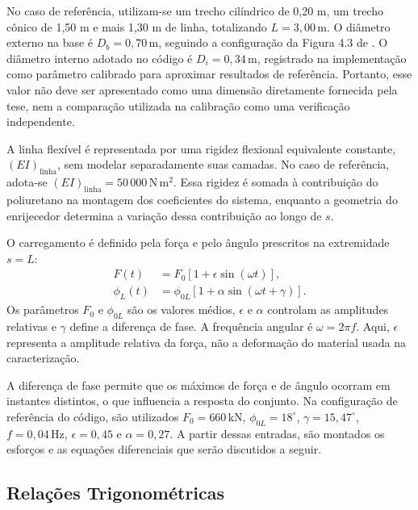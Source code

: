 \documentclass[arial,centeredequations,english,brazilian,oneside,section=TITLE]{ifes8}
\begin{document}
No caso de referência, utilizam-se um trecho cilíndrico de 0,20 m, um trecho cônico de
1,50 m e mais 1,30 m de linha, totalizando $L=3{,}00\,\mathrm{m}$. O diâmetro externo
na base é $D_b=0{,}70\,\mathrm{m}$, seguindo a configuração da Figura 4.3 de
. O diâmetro interno adotado no código é $D_i=0{,}34\,\mathrm{m}$,
registrado na implementação como parâmetro calibrado para aproximar resultados de
referência. Portanto, esse valor não deve ser apresentado como uma dimensão diretamente
fornecida pela tese, nem a comparação utilizada na calibração como uma verificação
independente.

A linha flexível é representada por uma rigidez flexional equivalente constante,
$(EI)_{\mathrm{linha}}$, sem modelar separadamente suas camadas. No caso de referência,
adota-se $(EI)_{\mathrm{linha}}=50\,000\,\mathrm{N\,m^2}$. Essa rigidez é somada à
contribuição do poliuretano na montagem dos coeficientes do sistema, enquanto a geometria
do enrijecedor determina a variação dessa contribuição ao longo de $s$.

O carregamento é definido pela força e pelo ângulo prescritos na extremidade $s=L$:
\begin{align}
  F(t)&=F_0\left[1+\epsilon\sin(\omega t)\right],
    \label{eq:forca-harmonica-metodologia}\\
  \phi_L(t)&=\phi_{0L}
    \left[1+\alpha\sin(\omega t+\gamma)\right].
    \label{eq:angulo-harmonico-metodologia}
\end{align}
Os parâmetros $F_0$ e $\phi_{0L}$ são os valores médios, $\epsilon$ e $\alpha$ controlam
as amplitudes relativas e $\gamma$ define a diferença de fase. A frequência angular é
$\omega=2\pi f$. Aqui, $\epsilon$ representa a amplitude relativa da força, não a
deformação do material usada na caracterização.

A diferença de fase permite que os máximos de força e de ângulo ocorram em instantes
distintos, o que influencia a resposta do conjunto. Na configuração de referência do
código, são utilizados $F_0=660\,\mathrm{kN}$, $\phi_{0L}=18^\circ$,
$\gamma=15{,}47^\circ$, $f=0{,}04\,\mathrm{Hz}$, $\epsilon=0{,}45$ e
$\alpha=0{,}27$. A partir dessas entradas, são montados os esforços e as equações
diferenciais que serão discutidos a seguir.

\subsection{Relações Trigonométricas}
\label{sec:relacoes-trigonometricas}
\end{document}
